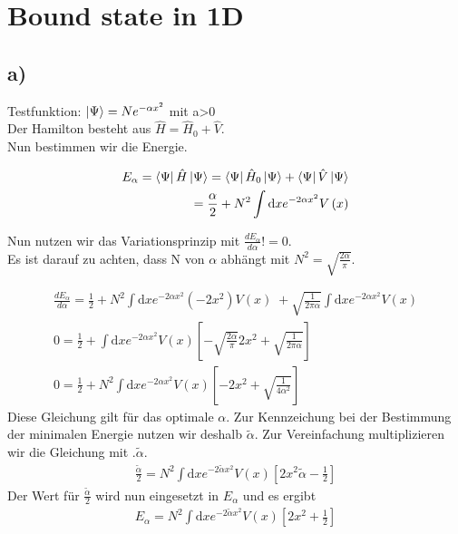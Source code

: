 \section{Bound state in 1D}

\subsection{a)}

Testfunktion: $\Ket{\Psi} = N e^{-\alpha x^2}$ mit a>0 \\

Der Hamilton besteht aus $\hat{H} = \hat{H}_0 + \hat{V}$.\\
Nun bestimmen wir die Energie.

\begin{align}
E_\alpha = \Bra{\Psi} \hat{H} \Ket{\Psi} = \Bra{\Psi} \hat{H}_0 \Ket{\Psi} + \Bra{\Psi} \hat{V} \Ket{\Psi} \\
= \frac{\alpha}{2} + N^2 \int  \mathrm{d}x e^{-2\alpha x^2} V\left(x \right)
\end{align}

Nun nutzen wir das Variationsprinzip mit $\frac{dE_{\alpha}}{d\alpha}  != 0 $.\\
Es ist darauf zu achten, dass N von $\alpha$ abh\"angt mit $N^2 = \sqrt{\frac{2\alpha}{\pi}}$.

\begin{align}
\frac{dE_{\alpha}}{d\alpha} = \frac{1}{2} + N^2 \int  \mathrm{d}x e^{-2\alpha x^2} \left(-2x^2 \right) V\left(x \right) \; + \sqrt{\frac{1}{2 \pi \alpha}} \int  \mathrm{d}x e^{-2\alpha x^2} V\left(x \right) \\
0 = \frac{1}{2} + \int  \mathrm{d}x e^{-2\alpha x^2} V\left(x \right) \left[ -\sqrt{\frac{2\alpha}{\pi}}2x^2 + \sqrt{\frac{1}{2\pi \alpha}} \right] \\
0 = \frac{1}{2} + N^2 \int  \mathrm{d}x e^{-2\alpha x^2} V\left(x \right) \left[-2x^2 + \sqrt{\frac{1}{4\alpha^2}} \right]
\end{align}
Diese Gleichung gilt f\"ur das optimale $\alpha$. Zur Kennzeichung bei der Bestimmung der minimalen Energie nutzen wir deshalb $\tilde{\alpha}$. Zur Vereinfachung multiplizieren wir die Gleichung mit .$\tilde{\alpha}$.
\begin{align}
\frac{\tilde{\alpha}}{2} = N^2 \int  \mathrm{d}x e^{-2\tilde{\alpha} x^2} V\left(x \right) \left[2x^2 \tilde{\alpha} - \frac{1}{2} \right]
\end{align}
Der Wert f\"ur $\frac{\tilde{\alpha}}{2}$ wird nun eingesetzt in $E_{\alpha}$ und es ergibt
\begin{align}
E_{\alpha} = N^2 \int  \mathrm{d}x e^{-2\tilde{\alpha} x^2} V\left(x \right) \left[2x^2 + \frac{1}{2} \right]
\end{align}